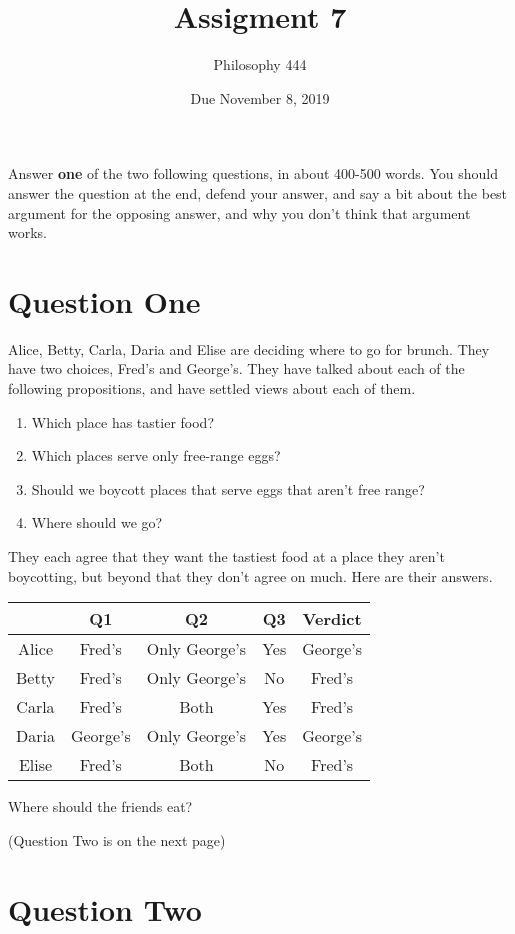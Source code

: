 \documentclass[11pt,]{article}
\title{Assigment 7}
\author{Philosophy 444}
\date{Due November 8, 2019}
\providecommand{\tightlist}{%
  \setlength{\itemsep}{0pt}\setlength{\parskip}{0pt}}
\begin{document}
\maketitle

Answer \textbf{one} of the two following questions, in about 400-500
words. You should answer the question at the end, defend your answer,
and say a bit about the best argument for the opposing answer, and why
you don't think that argument works.

\hypertarget{question-one}{%
\section{Question One}\label{question-one}}

Alice, Betty, Carla, Daria and Elise are deciding where to go for
brunch. They have two choices, Fred's and George's. They have talked
about each of the following propositions, and have settled views about
each of them.

\begin{enumerate}
\def\labelenumi{\arabic{enumi}.}
\tightlist
\item
  Which place has tastier food?
\item
  Which places serve only free-range eggs?
\item
  Should we boycott places that serve eggs that aren't free range?
\item
  Where should we go?
\end{enumerate}

They each agree that they want the tastiest food at a place they aren't
boycotting, but beyond that they don't agree on much. Here are their
answers.

\begin{longtable}[]{@{}ccccc@{}}
\toprule
& Q1 & Q2 & Q3 & Verdict\tabularnewline
\midrule
\endhead
Alice & Fred's & Only George's & Yes & George's\tabularnewline
Betty & Fred's & Only George's & No & Fred's\tabularnewline
Carla & Fred's & Both & Yes & Fred's\tabularnewline
Daria & George's & Only George's & Yes & George's\tabularnewline
Elise & Fred's & Both & No & Fred's\tabularnewline
\bottomrule
\end{longtable}

Where should the friends eat?

(Question Two is on the next page)

\newpage

\hypertarget{question-two}{%
\section{Question Two}\label{question-two}}
\end{document}
